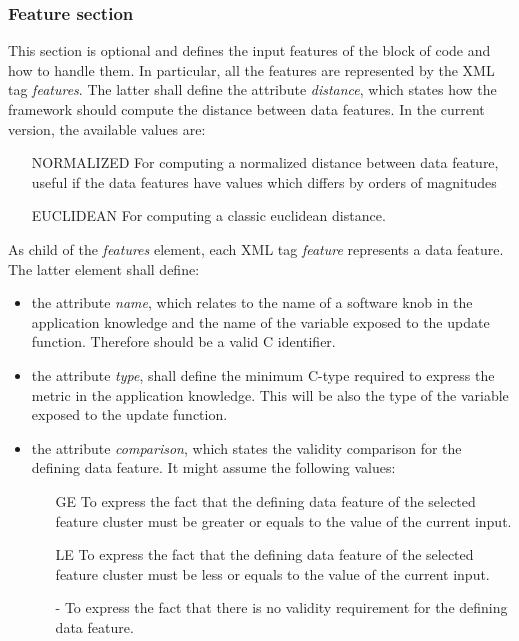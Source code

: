 \subsubsection*{Feature section}

This section is optional and defines the input features of the block of code and how to handle them.
In particular, all the features are represented by the XML tag \textit{features}.
The latter shall define the attribute \textit{distance}, which states how the framework should compute the distance between data features.
In the current version, the available values are:
\begin{itemize}
	\item[NORMALIZED] For computing a normalized distance between data feature, useful if the data features have values which differs by orders of magnitudes
	\item[EUCLIDEAN] For computing a classic euclidean distance.
\end{itemize}

As child of the \textit{features} element, each XML tag \textit{feature} represents a data feature.
The latter element shall define:
\begin{itemize}
	\item the attribute \textit{name}, which relates to the name of a software knob in the application knowledge and the name of the variable exposed to the update function. Therefore should be a valid C identifier.
	\item the attribute \textit{type}, shall define the minimum C-type required to express the metric in the application knowledge. This will be also the type of the variable exposed to the update function.
	\item the attribute \textit{comparison}, which states the validity comparison for the defining data feature. It might assume the following values:
	\begin{itemize}
		\item[GE] To express the fact that the defining data feature of the selected feature cluster must be greater or equals to the value of the current input.
		\item[LE] To express the fact that the defining data feature of the selected feature cluster must be less or equals to the value of the current input.
		\item[-] To express the fact that there is no validity requirement for the defining data feature.
	\end{itemize}
\end{itemize}


